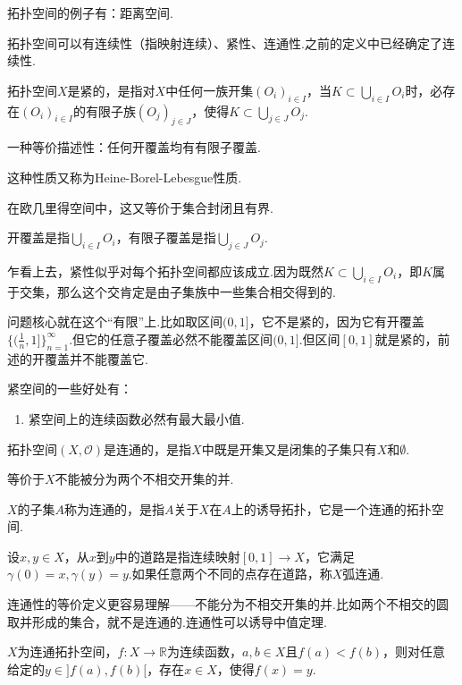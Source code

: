 拓扑空间的例子有：距离空间.

拓扑空间可以有连续性（指映射连续）、紧性、连通性.之前的定义中已经确定了连续性.

\begin{definition}[拓扑空间的紧性]\label{}
拓扑空间$X$是紧的，是指对$X$中任何一族开集$(O_i)_{i\in I}$，当$K\subset \bigcup_{i\in I}O_i$时，必存在$(O_i)_{i\in I}$的有限子族$(O_j)_{j\in J}$，使得$K\subset \bigcup_{j\in J}O_j$.
	
一种等价描述性：任何开覆盖均有有限子覆盖.

这种性质又称为Heine-Borel-Lebesgue性质.

在欧几里得空间中，这又等价于集合封闭且有界.
\end{definition}

开覆盖是指$\bigcup_{i\in I}O_i$，有限子覆盖是指$\bigcup_{j\in J}O_j$.

乍看上去，紧性似乎对每个拓扑空间都应该成立.因为既然$K\subset \bigcup_{i\in I}O_i$，即$K$属于交集，那么这个交肯定是由子集族中一些集合相交得到的.

问题核心就在这个“有限”上.比如取区间$(0,1]$，它不是紧的，因为它有开覆盖$\big\{(\frac{1}{n},1]\big\}_{n=1}^\infty$.但它的任意子覆盖必然不能覆盖区间$(0,1]$.但区间$[0,1]$就是紧的，前述的开覆盖并不能覆盖它.

紧空间的一些好处有：
\begin{enumerate}
\item 紧空间上的连续函数必然有最大最小值.
\end{enumerate}


\begin{definition}[拓扑空间的连通性]\label{}
拓扑空间$(X,\mathcal{O})$是连通的，是指$X$中既是开集又是闭集的子集只有$X$和$\emptyset$.

等价于$X$不能被分为两个不相交开集的并.

$X$的子集$A$称为连通的，是指$A$关于$X$在$A$上的诱导拓扑，它是一个连通的拓扑空间.

设$x,y\in X$，从$x$到$y$中的道路是指连续映射$[0,1]\rightarrow X$，它满足$\gamma(0)=x,\gamma(y)=y$.如果任意两个不同的点存在道路，称$X$弧连通.
\end{definition}

连通性的等价定义更容易理解——不能分为不相交开集的并.比如两个不相交的圆取并形成的集合，就不是连通的.连通性可以诱导中值定理.

\begin{definition}[Bolzano中值定理]\label{}
$X$为连通拓扑空间，$f\colon X\rightarrow \mathbb{R}$为连续函数，$a,b\in X$且$f(a)<f(b)$，则对任意给定的$y\in]f(a),f(b)[$，存在$x\in X$，使得$f(x)=y$.
\end{definition}

